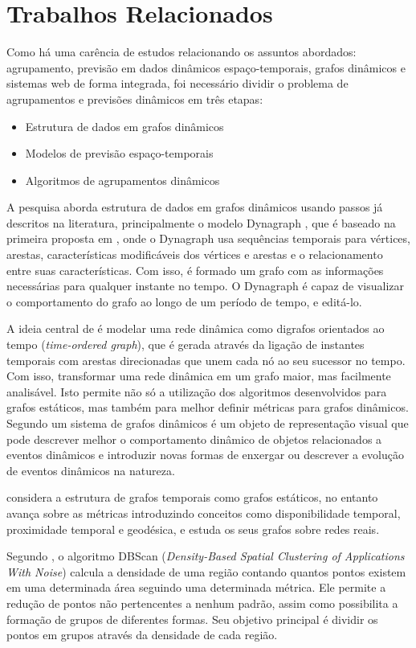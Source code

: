 \section{Trabalhos Relacionados}
 \label{trabalhos-relacionados} 
Como há uma carência de estudos relacionando os assuntos abordados: agrupamento,
previsão em dados dinâmicos espaço-temporais, grafos dinâmicos e sistemas web
de forma integrada, foi necessário dividir o problema de agrupamentos e previsões dinâmicos em três etapas:
\begin{itemize}
\item Estrutura de dados em grafos dinâmicos
\item Modelos de previsão espaço-temporais
\item Algoritmos de agrupamentos dinâmicos
\end{itemize}

A pesquisa aborda estrutura de dados em grafos dinâmicos usando passos já descritos na literatura,
principalmente o modelo Dynagraph \cite{dynagraph}, que é baseado na primeira proposta
em \cite{dynagraph2012}, onde o Dynagraph usa sequências temporais para vértices, arestas,
características modificáveis dos vértices e arestas e o relacionamento entre suas características.
Com isso, é formado um grafo com as informações necessárias para qualquer instante no tempo.
O Dynagraph é capaz de visualizar o comportamento do grafo ao longo de um período de tempo,
e editá-lo.

A ideia central de \cite{kim} é modelar uma rede dinâmica como digrafos orientados ao
tempo (\textit{time-ordered graph}), que é gerada através da ligação de instantes temporais com arestas
direcionadas que unem cada nó ao seu sucessor no tempo. Com isso, transformar uma rede dinâmica
em um grafo maior, mas facilmente analisável. Isto permite não só a utilização dos algoritmos 
desenvolvidos para grafos estáticos, mas também para melhor definir métricas para grafos dinâmicos.
Segundo \cite{kim} um sistema de grafos dinâmicos é um objeto de representação visual
que pode descrever melhor o comportamento dinâmico de objetos relacionados a eventos dinâmicos e
introduzir novas formas de enxergar ou descrever a evolução de eventos dinâmicos na natureza.

\cite{kostakos} considera a estrutura de grafos temporais como grafos
estáticos, no entanto avança sobre as métricas introduzindo conceitos como disponibilidade
temporal, proximidade temporal e geodésica, e estuda os seus grafos sobre redes reais.

Segundo \cite{ESTER1996}, o algoritmo DBScan (\textit{Density-Based Spatial Clustering
of Applications With Noise}) calcula a densidade de uma região contando quantos pontos existem
em uma determinada área seguindo uma determinada métrica. Ele permite a redução de pontos não
pertencentes a nenhum padrão, assim como possibilita a formação de grupos de diferentes formas.
Seu objetivo principal é dividir os pontos em grupos através da densidade de cada região.

